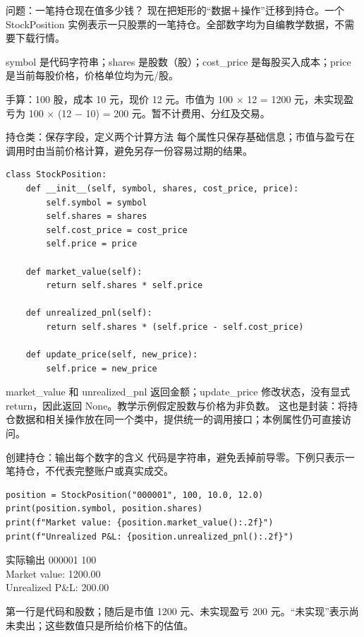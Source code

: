 \documentclass[9pt]{ctexbeamer}
\begin{document}
\begin{frame}{问题：一笔持仓现在值多少钱？}
现在把矩形的“数据＋操作”迁移到持仓。一个 StockPosition 实例表示一只股票的一笔持仓。全部数字均为自编教学数据，不需要下载行情。
\par
symbol 是代码字符串；shares 是股数（股）；cost\_price 是每股买入成本；price 是当前每股价格，价格单位均为元/股。
\par
手算：100 股，成本 10 元，现价 12 元。市值为 100 × 12 = 1200 元，未实现盈亏为 100 × (12 − 10) = 200 元。暂不计费用、分红及交易。
\par{}

\end{frame}

\begin{frame}[fragile]{持仓类：保存字段，定义两个计算方法}
每个属性只保存基础信息；市值与盈亏在调用时由当前价格计算，避免另存一份容易过期的结果。
\begin{lstlisting}
class StockPosition:
    def __init__(self, symbol, shares, cost_price, price):
        self.symbol = symbol
        self.shares = shares
        self.cost_price = cost_price
        self.price = price

    def market_value(self):
        return self.shares * self.price

    def unrealized_pnl(self):
        return self.shares * (self.price - self.cost_price)

    def update_price(self, new_price):
        self.price = new_price
\end{lstlisting}
\small market\_value 和 unrealized\_pnl 返回金额；update\_price 修改状态，没有显式 return，因此返回 None。教学示例假定股数与价格为非负数。 这也是封装：将持仓数据和相关操作放在同一个类中，提供统一的调用接口；本例属性仍可直接访问。
\par{}

\end{frame}

\begin{frame}[fragile]{创建持仓：输出每个数字的含义}
代码是字符串，避免丢掉前导零。下例只表示一笔持仓，不代表完整账户或真实成交。
\begin{lstlisting}
position = StockPosition("000001", 100, 10.0, 12.0)
print(position.symbol, position.shares)
print(f"Market value: {position.market_value():.2f}")
print(f"Unrealized P&L: {position.unrealized_pnl():.2f}")
\end{lstlisting}
\begin{exampleblock}{实际输出}
{\ttfamily\small 000001 100\\
Market value: 1200.00\\
Unrealized P\&L: 200.00}
\end{exampleblock}
\small 第一行是代码和股数；随后是市值 1200 元、未实现盈亏 200 元。“未实现”表示尚未卖出；这些数值只是所给价格下的估值。
\par{}

\end{frame}
\end{document}
